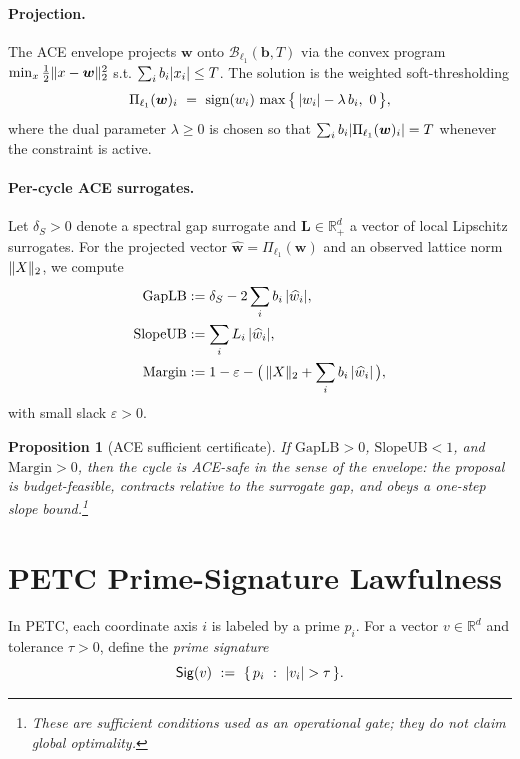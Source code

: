 \documentclass[11pt]{article}
\DeclarePairedDelimiter{\norm}{\lVert}{\rVert}
\DeclarePairedDelimiter{\abs}{\lvert}{\rvert}
\newcommand{\w}{\bm{w}}
\newcommand{\bb}{\bm{b}}
\newcommand{\LL}{\bm{L}}
\newcommand{\Tbudget}{T}
\newcommand{\GapLB}{\mathrm{GapLB}}
\newcommand{\SlopeUB}{\mathrm{SlopeUB}}
\newcommand{\Margin}{\mathrm{Margin}}
\newtheorem{proposition}{Proposition}
\begin{document}
\paragraph{Projection.} The ACE envelope projects $\w$ onto $\mathcal{B}_{\ell_1}(\bb,\Tbudget)$ via the convex program $\min_x \tfrac{1}{2}\norm{x-\w}_2^2$ s.t. $\sum_i b_i\abs{x_i}\le\Tbudget$. The solution is the weighted soft-thresholding
\begin{equation}
\Pi_{\ell_1}(\w)_i~=~\operatorname{sign}(w_i)\,\max\big\{\,\abs{w_i}-\lambda\,b_i,~0\,\big\},
\end{equation}
where the dual parameter $\lambda\ge 0$ is chosen so that $\sum_i b_i\abs{\Pi_{\ell_1}(\w)_i}=\Tbudget$ whenever the constraint is active.

\paragraph{Per-cycle ACE surrogates.} Let $\delta_S>0$ denote a spectral gap surrogate and $\LL\in\mathbb{R}^d_+$ a vector of local Lipschitz surrogates. For the projected vector $\widehat{\w}=\Pi_{\ell_1}(\w)$ and an observed lattice norm $\norm{X}_2$, we compute
\begin{align}
\GapLB &:= \delta_S - 2\sum_i b_i\,\abs{\widehat{w}_i},\\
\SlopeUB &:= \sum_i L_i\,\abs{\widehat{w}_i},\\
\Margin &:= 1-\varepsilon-\big(\,\norm{X}_2+\sum_i b_i\,\abs{\widehat{w}_i}\,\big),
\end{align}
with small slack $\varepsilon>0$.

\begin{proposition}[ACE sufficient certificate]
If $\GapLB>0$, $\SlopeUB<1$, and $\Margin>0$, then the cycle is \emph{ACE-safe} in the sense of the envelope: the proposal is budget-feasible, contracts relative to the surrogate gap, and obeys a one-step slope bound.\footnote{These are \emph{sufficient} conditions used as an operational gate; they do not claim global optimality.}
\end{proposition}

\section{PETC Prime-Signature Lawfulness}
\label{sec:petc}
In PETC, each coordinate axis $i$ is labeled by a prime $p_i$. For a vector $v\in\mathbb{R}^d$ and tolerance $\tau>0$, define the \emph{prime signature}
\begin{equation}
\mathsf{Sig}(v)~:=~\{\,p_i~:~\abs{v_i}>\tau\,\}.
\end{equation}
\end{document}
